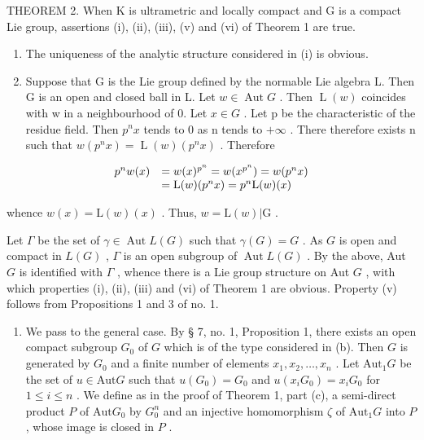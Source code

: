 THEOREM 2. When K is ultrametric and locally compact and G is a compact Lie group, assertions (i), (ii), (iii), (v) and (vi) of Theorem 1 are true.

\begin{enumerate}
\def\labelenumi{(\alph{enumi})}
\item
  The uniqueness of the analytic structure considered in (i) is obvious.
\item
  Suppose that G is the Lie group defined by the normable Lie algebra L. Then G is an open and closed ball in L. Let \(w \in \operatorname{Aut} G\) . Then \(\operatorname{L}(w)\) coincides with w in a neighbourhood of 0. Let \(x \in G\) . Let p be the characteristic of the residue field. Then \(p^{n}x\) tends to 0 as n tends to \(+\infty\) . There therefore exists n such that \(w(p^{n}x) = \operatorname{L}(w)(p^{n}x)\) . Therefore
\end{enumerate}

\[
\begin{array}{r l} p ^ {n} w (x) & = w (x) ^ {p ^ {n}} = w (x ^ {p ^ {n}}) = w (p ^ {n} x) \\ & = \mathrm{L} (w) (p ^ {n} x) = p ^ {n} \mathrm{L} (w) (x) \end{array}
\]

whence \(w(x) = \mathrm{L}(w)(x)\) . Thus, \(w = \mathrm{L}(w)|\mathrm{G}\) .

Let \(\Gamma\) be the set of \(\gamma \in \operatorname{Aut} L(G)\) such that \(\gamma(G) = G\) . As \(G\) is open and compact in \(L(G)\) , \(\Gamma\) is an open subgroup of \(\operatorname{Aut} L(G)\) . By the above, Aut \(G\) is identified with \(\Gamma\) , whence there is a Lie group structure on Aut \(G\) , with which properties (i), (ii), (iii) and (vi) of Theorem 1 are obvious. Property (v) follows from Propositions 1 and 3 of no. 1.

\begin{enumerate}
\def\labelenumi{(\alph{enumi})}
\setcounter{enumi}{2}
\tightlist
\item
  We pass to the general case. By § 7, no. 1, Proposition 1, there exists an open compact subgroup \(G_0\) of \(G\) which is of the type considered in (b). Then \(G\) is generated by \(G_0\) and a finite number of elements \(x_1, x_2, \ldots, x_n\) . Let \(\text{Aut}_1G\) be the set of \(u \in \text{Aut}G\) such that \(u(G_0) = G_0\) and \(u(x_iG_0) = x_iG_0\) for \(1 \leqslant i \leqslant n\) . We define as in the proof of Theorem 1, part (c), a semi-direct product \(P\) of \(\text{Aut}G_0\) by \(G_0^n\) and an injective homomorphism \(\zeta\) of \(\text{Aut}_1G\) into \(P\) , whose image is closed in \(P\) .
\end{enumerate}

